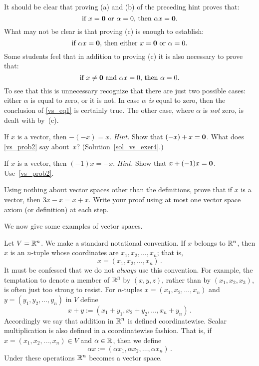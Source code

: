 \begin{rem} It should be clear that proving (a) and (b) of the preceding hint proves that:
  \[ \text{if $x = \mathbf{0}$ or $\alpha = 0$, then $\alpha x = \mathbf{0}$.} \]
What may not be clear is that proving (c) is enough to establish:
 \begin{equation}
   \label{vs_eq1}\text{if $\alpha x = \mathbf{0}$, then either $x = \mathbf{0}$ or $\alpha = 0$.}
 \end{equation}
Some students feel that in addition to proving (c) it is also necessary to prove that:
  \[ \text{if $x \ne \mathbf{0}$ and $\alpha x = 0$, then $\alpha = 0$.} \]
To see that this is unnecessary recognize that there are just two possible cases: either
$\alpha$ is equal to zero, or it is not.  In case $\alpha$ \emph{is} equal to zero, then the
conclusion of \eqref{vs_eq1} is certainly true.   The other case, where $\alpha$ is \emph{not}
zero, is dealt with by~(c).
\end{rem}

\begin{exer}\label{vs_exer4} If $x$ is a vector, then $-(-x) = x$.  \emph{Hint.}  Show that
$(-x) + x = \mathbf{0}$.  What does \ref{vs_prob2} say about~$x$? (Solution~\ref{sol_vs_exer4}.)
\end{exer}

\begin{prob}\label{vs_prob1} If $x$ is a vector, then $(-1)x = -x$. \emph{Hint.}  Show that
$x + (-1)x = \mathbf{0}$.  Use~\ref{vs_prob2}.
\end{prob}

\begin{prob} Using nothing about vector spaces other than the definitions, prove that if $x$ is a
vector, then $3x - x = x + x$. Write your proof using at most one vector space axiom (or
definition) at each step.
\end{prob}

We now give some examples of vector spaces.

\begin{exam} Let $V = \mathbb{R}^n$.  We make a standard notational convention.  If $x$ belongs to $\mathbb{R}^n$,
then $x$ is an $n$-tuple whose coordinates are $x_1,x_2, \dots, x_n$; that is,
  \[ x = (x_1, x_2, \dots ,x_n)\,. \]
It must be confessed that we do not \emph{always} use this convention.  For example, the
temptation to denote a member of $\mathbb{R}^3$ by $(x,y,z)$, rather than by $(x_1, x_2, x_3)$, is
often just too strong to resist.  For $n$-tuples $x = (x_1, x_2,\dots, x_n)$ and $y = (y_1,
y_2, \dots, y_n)$ in $V$ define
 \[ x + y := (x_1 + y_1, x_2 + y_2,  \dots, x_n + y_n)\,. \]
Accordingly we say that addition in $\mathbb{R}^n$ is defined coordinatewise.  Scalar multiplication
is also defined in a coordinatewise fashion. That is, if $x = (x_1, x_2,\dots, x_n) \in V$ and
$\alpha \in \mathbb{R}$, then we define
  \[ \alpha x := (\alpha x_1, \alpha x_2, \dots, \alpha x_n)\,. \]
Under these operations $\mathbb{R}^n$ becomes a vector space.
\end{exam}

